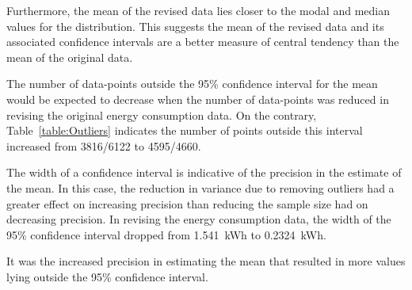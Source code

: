 \documentclass[a4paper,10pt,twocolumn]{article}
\begin{document}
Furthermore, the mean of the revised data lies closer to the modal and median 
values for the distribution. This suggests the mean of the revised data and its 
associated confidence intervals are a better measure of central tendency than 
the mean of the original data.

The number of data-points outside the 95\% confidence interval for the mean 
would be expected to decrease when the number of data-points was reduced in 
revising the original energy consumption data. On the contrary, 
Table~\vref{table:Outliers} indicates the number of points outside this 
interval increased from 3816/6122 to 4595/4660.

The width of a confidence interval is indicative of the precision in the 
estimate of the mean. In this case, the reduction in variance due to removing 
outliers had a greater effect on increasing precision than reducing the sample 
size had on decreasing precision. In revising the energy consumption data, the 
width of the 95\% confidence interval dropped from 1.541~kWh to 0.2324~kWh.

It was the increased precision in estimating the mean that resulted in more 
values lying outside the 95\% confidence interval.

\printbibliography

\clearpage
\end{document}
